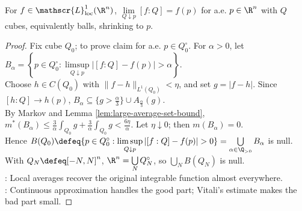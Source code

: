 \begin{theorem} \label{thm:lebesgue-average-value-theorem} \\
For $f\in\mathscr{L}^1_{\mathrm{loc}}(\R^n)$, $\lim\limits_{Q\downarrow p}[f:Q]=f(p)$ for a.e. $p\in\R^n$ with $Q$ cubes, equivalently balls, shrinking to $p$.
\begin{proof} Fix cube $Q_0$; to prove claim for a.e. $p\in Q_0^\circ$. For $\alpha>0$, let $B_\alpha=\left\{p\in Q_0^\circ:\limsup\limits_{Q\downarrow p}|[f:Q]-f(p)|>\alpha\right\}$.\\
Choose $h\in C(Q_0)$ with $\|f-h\|_{L^1(Q_0)}<\eta$, and set $g=|f-h|$. Since $[h:Q]\to h(p)$, $B_\alpha\subseteq \{g>\frac{\alpha}{3}\}\cup A_{\frac{\alpha}{3}}(g)$.\\
By Markov and Lemma \ref{lem:large-average-set-bound}, $m^\ast(B_\alpha)\le \frac{3}{\alpha}\int_{Q_0}g+\frac{3}{\alpha}\int_{Q_0}g <\frac{6\eta}{\alpha}$. Let $\eta\downarrow0$; then $m(B_\alpha)=0$.\\
Hence $B(Q_0)\defeq\{p\in Q_0^\circ:\limsup\limits_{Q\downarrow p}|[f:Q]-f(p)|>0\}=\bigcup\limits_{\alpha\in\Q_{>0}}B_\alpha$ is null.\\
With $Q_N\defeq[-N,N]^n$, $\R^n=\bigcup\limits_NQ_N^\circ$, so $\bigcup\limits_NB(Q_N)$ is null.\\
: Local averages recover the original integrable function almost everywhere.\\
: Continuous approximation handles the good part; Vitali's estimate makes the bad part small.
\end{proof}
\end{theorem}

